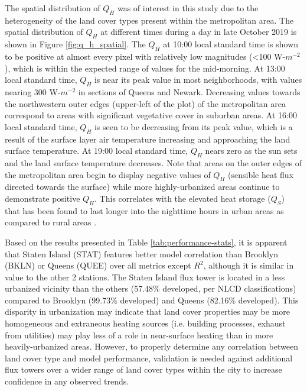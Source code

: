 The spatial distribution of $Q_H$ was of interest in this study due to the heterogeneity of the land cover types present within the metropolitan area. The spatial distribution of $Q_H$ at different times during a day in late October 2019 is shown in Figure \ref{fig:q_h_spatial}. The $Q_H$ at 10:00 local standard time is shown to be positive at almost every pixel with relatively low magnitudes (\textless 100 W-$m^{-2}$), which is within the expected range of values for the mid-morning. At 13:00 local standard time, $Q_H$ is near its peak value in most neighborhoods, with values nearing 300 W-$m^{-2}$ in sections of Queens and Newark. Decreasing values towards the northwestern outer edges (upper-left of the plot) of the metropolitan area correspond to areas with significant vegetative cover in suburban areas. At 16:00 local standard time, $Q_H$ is seen to be decreasing from its peak value, which is a result of the surface layer air temperature increasing and approaching the land surface temperature. At 19:00 local standard time, $Q_H$ nears zero as the sun sets and the land surface temperature decreases. Note that areas on the outer edges of the metropolitan area begin to display negative values of $Q_H$ (sensible heat flux directed towards the surface) while more highly-urbanized areas continue to demonstrate positive $Q_H$. This correlates with the elevated heat storage ($Q_S$) that has been found to last longer into the nighttime hours in urban areas as compared to rural areas \citep{Grimmond_1999, Hrisko_2021}.

Based on the results presented in Table \ref{tab:performance-stats}, it is apparent that Staten Island (STAT) features better model correlation than Brooklyn (BKLN) or Queens (QUEE) over all metrics except $R^2$, although it is similar in value to the other 2 stations. The Staten Island flux tower is located in a less urbanized vicinity than the others (57.48\% developed, per NLCD classifications) compared to Brooklyn (99.73\% developed) and Queens (82.16\% developed). This disparity in urbanization may indicate that land cover properties may be more homogeneous and extraneous heating sources (i.e. building processes, exhaust from utilities) may play less of a role in near-surface heating than in more heavily-urbanized areas. However, to properly determine any correlation between land cover type and model performance, validation is needed against additional flux towers over a wider range of land cover types within the city to increase confidence in any observed trends.

